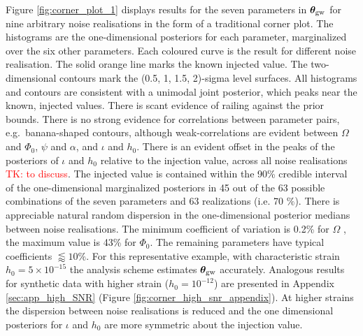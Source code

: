 \documentclass[fleqn,usenatbib,useAMS]{mnras}
\begin{document}
Figure \ref{fig:corner_plot_1} displays results for the seven parameters in $\boldsymbol{\theta}_{\rm gw}$ for nine arbitrary noise realisations in the form of a traditional corner plot. The histograms are the one-dimensional posteriors for each parameter, marginalized over the six other parameters. Each coloured curve is the result for different noise realisation. The solid orange line marks the known injected value. The two-dimensional contours mark the (0.5, 1, 1.5, 2)-sigma level surfaces. All histograms and contours are consistent with a unimodal joint posterior, which peaks near the known, injected values. There is scant evidence of railing against the prior bounds. There is no strong evidence for correlations between parameter pairs, e.g.\ banana-shaped contours, although weak-correlations are evident between $\Omega$ and $\Phi_0$, $\psi$ and $\alpha$, and $\iota$ and $h_0$. There is an evident offset in the peaks of the posteriors of $\iota$ and $h_0$ relative to the injection value, across all noise realisations \textcolor{red}{TK: to discuss}. The injected value is contained within the 90\% credible interval of the one-dimensional marginalized posteriors in 45 out of the 63 possible combinations of the seven parameters and 63 realizations (i.e. 70 $\%$). There is appreciable natural random dispersion in the one-dimensional posterior medians between noise realisations. The minimum coefficient of variation is  0.2\% for $\Omega$ , the maximum value is 43\% for $\Phi_0$. The remaining parameters have typical coefficients $\lessapprox 10 \%$. For this representative example, with characteristic strain $h_0 = 5 \times 10^{-15}$ the analysis scheme estimates $\boldsymbol{\theta}_{\rm gw}$ accurately. Analogous results for synthetic data with higher strain ($h_0 = 10^{-12}$) are presented in Appendix \ref{sec:app_high_SNR} (Figure \ref{fig:corner_high_snr_appendix}). At higher strains the dispersion between noise realisations is reduced and the one dimensional posteriors for $\iota$ and $h_0$ are more symmetric about the injection value. \newline 
\end{document}
